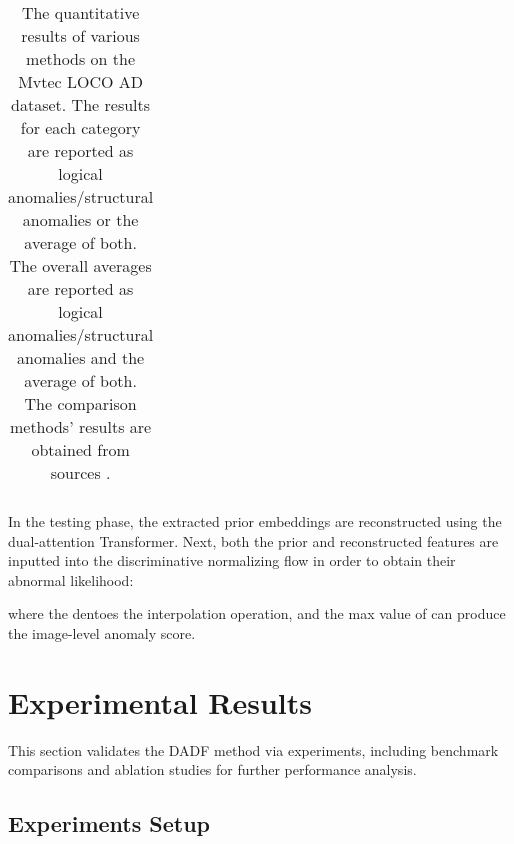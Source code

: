 \documentclass[journal]{IEEEtran}
\begin{document}
\begin{table*}
\caption{{The quantitative results of various methods on the Mvtec LOCO AD dataset. The results for each category are reported as logical anomalies/structural anomalies or the average of both. The overall averages are reported as logical anomalies/structural anomalies and the average of both. The comparison methods' results are obtained from sources \cite{r23,r24,r25}.}}

\label{table}
\setlength{\tabcolsep}{3pt}
\begin{threeparttable}
\begin{tabular}{p{\textwidth}}

\end{tabular}
\end{threeparttable}
\label{table2}
\end{table*}

In the testing phase, the extracted prior embeddings are reconstructed using the dual-attention Transformer. Next, both the prior and reconstructed features are inputted into the discriminative normalizing flow in order to obtain their abnormal likelihood:

where the  dentoes the interpolation operation, and the max value of  can produce the image-level anomaly score.


\section{Experimental Results}
This section validates the DADF method via experiments, including benchmark comparisons and ablation studies for further performance analysis.

\subsection{Experiments Setup}
\end{document}
